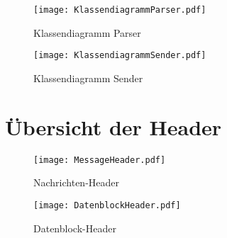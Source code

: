 \begin{figure}[H]
\centering
\texttt{[image: KlassendiagrammParser.pdf]}
\caption{Klassendiagramm Parser}
\label{fig:KlassendiagrammParser}
\end{figure}

\newpage

\begin{figure}[H]
\centering
\texttt{[image: KlassendiagrammSender.pdf]}
\caption{Klassendiagramm Sender}
\label{fig:KlassendiagrammSender}
\end{figure}

\section{Übersicht der Header}
\label{sec:HeaderUebersicht}

\begin{figure}[H]
	\centering
	\texttt{[image: MessageHeader.pdf]}
	\caption{Nachrichten-Header}
	\label{fig:NachrichtenHeader}
\end{figure}

\newpage

\begin{figure}[H]
	\centering
	\texttt{[image: DatenblockHeader.pdf]}
	\caption{Datenblock-Header}
	\label{fig:DatenblockHeader}
\end{figure}